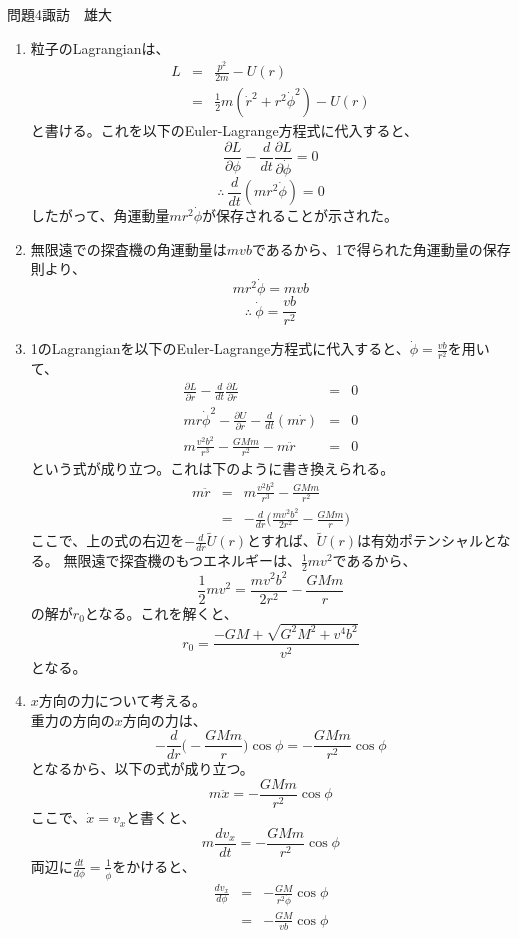 \documentclass[fleqn]{jbook}
\newcommand{\rd}{\partial} %
\begin{document}
\begin{answer}{問題4}{諏訪　雄大}
\begin{enumerate}
\item 粒子のLagrangianは、
	\begin{eqnarray*}
	L&=&\frac{p^2}{2m}-U(r)\\
	&=&\frac{1}{2}m(\dot r^2+r^2\dot\phi^2)-U(r)
	\end{eqnarray*}
	と書ける。これを以下のEuler-Lagrange方程式に代入すると、
	\[
	\frac{\rd L}{\rd\phi}-\frac{d}{dt}\frac{\rd L}{\rd\dot\phi}=0
	\]
	\[
	∴\ \frac{d}{dt}(mr^2\dot\phi)=0
	\]
	したがって、角運動量$mr^2\dot\phi$が保存されることが示された。
\item 無限遠での探査機の角運動量は$mvb$であるから、1で得られた角運動量の保存則より、
	\[
	mr^2\dot\phi=mvb
	\]
	\[
	∴\ \dot\phi=\frac{vb}{r^2}
	\]
\item 1のLagrangianを以下のEuler-Lagrange方程式に代入すると、$\dot\phi=\frac{vb}{r^2}$を用いて、
	\begin{eqnarray*}
	\frac{\rd L}{\rd r}-\frac{d}{dt}\frac{\rd L}{\rd\dot r}&=&0\\
	mr\dot\phi^2-\frac{\rd U}{\rd r}-\frac{d}{dt}(m\dot r)&=&0\\
	m\frac{v^2b^2}{r^3}-\frac{GMm}{r^2}-m\ddot r&=&0
	\end{eqnarray*}
	という式が成り立つ。これは下のように書き換えられる。
	\begin{eqnarray*}
	m\ddot r&=&m\frac{v^2b^2}{r^3}-\frac{GMm}{r^2}\\
	&=&-\frac{d}{dr}\bigg(\frac{mv^2b^2}{2r^2}-\frac{GMm}{r}\bigg)
	\end{eqnarray*}
	ここで、上の式の右辺を$-\frac{d}{dr}\tilde U(r)$とすれば、$\tilde U(r)$は有効ポテンシャルとなる。
	無限遠で探査機のもつエネルギーは、$\frac{1}{2}mv^2$であるから、
	\[
	\frac{1}{2}mv^2=\frac{mv^2b^2}{2r^2}-\frac{GMm}{r}
	\]
	の解が$r_0$となる。これを解くと、
	\[
	r_0=\frac{-GM+\sqrt{G^2M^2+v^4b^2}}{v^2}
	\]
	となる。
\item $x$方向の力について考える。\\
	重力の方向の$x$方向の力は、
	\[
	-\frac{d}{dr}\bigg(-\frac{GMm}{r}\bigg)\cos\phi=-\frac{GMm}{r^2}\cos\phi
	\]
	となるから、以下の式が成り立つ。
	\[
	m\ddot x=-\frac{GMm}{r^2}\cos\phi
	\]
	ここで、$\dot x=v_x$と書くと、
	\[
	m\frac{dv_x}{dt}=-\frac{GMm}{r^2}\cos\phi
	\]
	両辺に$\frac{dt}{d\phi}=\frac{1}{\dot\phi}$をかけると、
	\begin{eqnarray*}
	\frac{dv_x}{d\phi}&=&-\frac{GM}{r^2\dot\phi}\cos\phi\\
	&=&-\frac{GM}{vb}\cos\phi

\end{eqnarray*}
\end{enumerate}
\end{answer}
\end{document}
